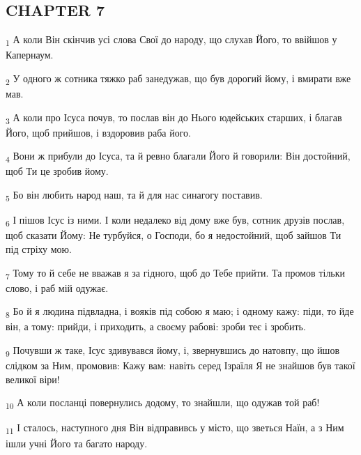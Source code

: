 \subsection{CHAPTER 7}
\begin{tcolorbox}
\textsubscript{1} А коли Він скінчив усі слова Свої до народу, що слухав Його, то ввійшов у Капернаум.
\end{tcolorbox}
\begin{tcolorbox}
\textsubscript{2} У одного ж сотника тяжко раб занедужав, що був дорогий йому, і вмирати вже мав.
\end{tcolorbox}
\begin{tcolorbox}
\textsubscript{3} А коли про Ісуса почув, то послав він до Нього юдейських старших, і благав Його, щоб прийшов, і вздоровив раба його.
\end{tcolorbox}
\begin{tcolorbox}
\textsubscript{4} Вони ж прибули до Ісуса, та й ревно благали Його й говорили: Він достойний, щоб Ти це зробив йому.
\end{tcolorbox}
\begin{tcolorbox}
\textsubscript{5} Бо він любить народ наш, та й для нас синагогу поставив.
\end{tcolorbox}
\begin{tcolorbox}
\textsubscript{6} І пішов Ісус із ними. І коли недалеко від дому вже був, сотник друзів послав, щоб сказати Йому: Не турбуйся, о Господи, бо я недостойний, щоб зайшов Ти під стріху мою.
\end{tcolorbox}
\begin{tcolorbox}
\textsubscript{7} Тому то й себе не вважав я за гідного, щоб до Тебе прийти. Та промов тільки слово, і раб мій одужає.
\end{tcolorbox}
\begin{tcolorbox}
\textsubscript{8} Бо й я людина підвладна, і вояків під собою я маю; і одному кажу: піди, то йде він, а тому: прийди, і приходить, а своєму рабові: зроби теє і зробить.
\end{tcolorbox}
\begin{tcolorbox}
\textsubscript{9} Почувши ж таке, Ісус здивувався йому, і, звернувшись до натовпу, що йшов слідком за Ним, промовив: Кажу вам: навіть серед Ізраїля Я не знайшов був такої великої віри!
\end{tcolorbox}
\begin{tcolorbox}
\textsubscript{10} А коли посланці повернулись додому, то знайшли, що одужав той раб!
\end{tcolorbox}
\begin{tcolorbox}
\textsubscript{11} І сталось, наступного дня Він відправивсь у місто, що зветься Наїн, а з Ним ішли учні Його та багато народу.
\end{tcolorbox}
